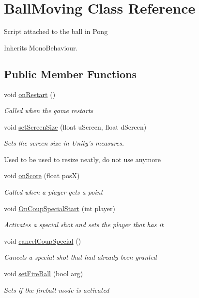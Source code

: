 \hypertarget{class_ball_moving}{\section{Ball\-Moving Class Reference}
\label{class_ball_moving}
}


Script attached to the ball in Pong  




Inherits Mono\-Behaviour.

\subsection*{Public Member Functions}
\begin{DoxyCompactItemize}
\item 
void \hyperlink{class_ball_moving_a921de446155584e6102d31b159420239}{on\-Restart} ()
\begin{DoxyCompactList}\small\item\em Called when the game restarts \end{DoxyCompactList}\item 
void \hyperlink{class_ball_moving_a7244395d1df380f26c718101e035066c}{set\-Screen\-Size} (float u\-Screen, float d\-Screen)
\begin{DoxyCompactList}\small\item\em Sets the screen size in Unity's measures.\par
 Used to be used to resize neatly, do not use anymore \end{DoxyCompactList}\item 
void \hyperlink{class_ball_moving_acd2f41c4b1f8b756bed2c8a606239f13}{on\-Score} (float pos\-X)
\begin{DoxyCompactList}\small\item\em Called when a player gets a point \end{DoxyCompactList}\item 
void \hyperlink{class_ball_moving_a5a60e1e1cccd04ac820899233f5b54e6}{On\-Coup\-Special\-Start} (int player)
\begin{DoxyCompactList}\small\item\em Activates a special shot and sets the player that has it \end{DoxyCompactList}\item 
void \hyperlink{class_ball_moving_ab4ce11468ced82cc6e3fab25bd496c57}{cancel\-Coup\-Special} ()
\begin{DoxyCompactList}\small\item\em Cancels a special shot that had already been granted \end{DoxyCompactList}\item 
void \hyperlink{class_ball_moving_a9590dbee6358d043bccf7264194043ce}{set\-Fire\-Ball} (bool arg)
\begin{DoxyCompactList}\small\item\em Sets if the fireball mode is activated \end{DoxyCompactList}\end{DoxyCompactItemize}
